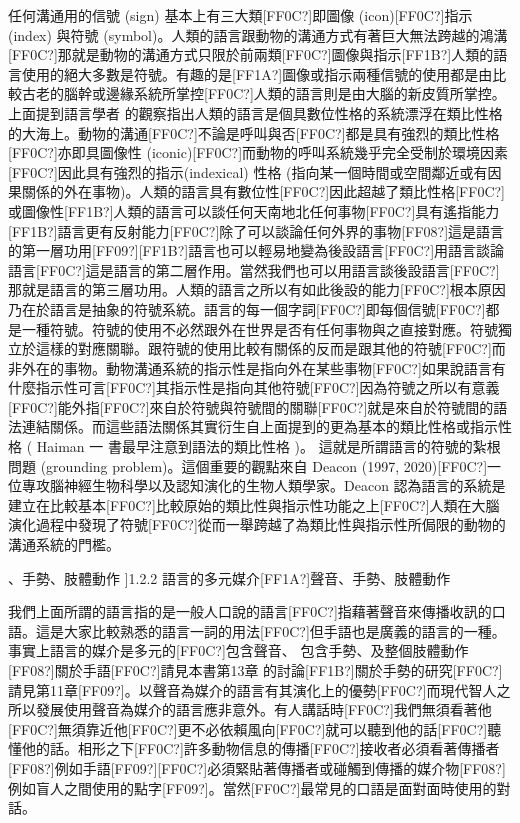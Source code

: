 任何溝通用的信號 (sign) 基本上有三大類[FF0C?]即圖像 (icon)[FF0C?]指示 (index) 與符號 (symbol)。人類的語言跟動物的溝通方式有著巨大無法跨越的鴻溝[FF0C?]那就是動物的溝通方式只限於前兩類[FF0C?]圖像與指示[FF1B?]人類的語言使用的絕大多數是符號。有趣的是[FF1A?]圖像或指示兩種信號的使用都是由比較古老的腦幹或邊緣系統所掌控[FF0C?]人類的語言則是由大腦的新皮質所掌控。上面提到語言學者 \parencite{Bolinger1968} 的觀察指出人類的語言是個具數位性格的系統漂浮在類比性格的大海上。動物的溝通[FF0C?]不論是呼叫與否[FF0C?]都是具有強烈的類比性格[FF0C?]亦即具圖像性 (iconic)[FF0C?]而動物的呼叫系統幾乎完全受制於環境因素[FF0C?]因此具有強烈的指示(indexical) 性格 (指向某一個時間或空間鄰近或有因果關係的外在事物)。人類的語言具有數位性[FF0C?]因此超越了類比性格[FF0C?]或圖像性[FF1B?]人類的語言可以談任何天南地北任何事物[FF0C?]具有遙指能力[FF1B?]語言更有反射能力[FF0C?]除了可以談論任何外界的事物[FF08?]這是語言的第一層功用[FF09?][FF1B?]語言也可以輕易地變為後設語言[FF0C?]用語言談論語言[FF0C?]這是語言的第二層作用。當然我們也可以用語言談後設語言[FF0C?]那就是語言的第三層功用。人類的語言之所以有如此後設的能力[FF0C?]根本原因乃在於語言是抽象的符號系統。語言的每一個字詞[FF0C?]即每個信號[FF0C?]都是一種符號。符號的使用不必然跟外在世界是否有任何事物與之直接對應。符號獨立於這樣的對應關聯。跟符號的使用比較有關係的反而是跟其他的符號[FF0C?]而非外在的事物。動物溝通系統的指示性是指向外在某些事物[FF0C?]如果說語言有什麼指示性可言[FF0C?]其指示性是指向其他符號[FF0C?]因為符號之所以有意義[FF0C?]能外指[FF0C?]來自於符號與符號間的關聯[FF0C?]就是來自於符號間的語法連結關係。而這些語法關係其實衍生自上面提到的更為基本的類比性格或指示性格 ( Haiman 一 書最早注意到語法的類比性格 )。 這就是所謂語言的符號的紮根問題 (grounding problem)。這個重要的觀點來自 Deacon (1997, 2020)[FF0C?]一位專攻腦神經生物科學以及認知演化的生物人類學家。Deacon 認為語言的系統是建立在比較基本[FF0C?]比較原始的類比性與指示性功能之上[FF0C?]人類在大腦演化過程中發現了符號[FF0C?]從而一舉跨越了為類比性與指示性所侷限的動物的溝通系統的門檻。

、手勢、肢體動作  ]{1.2.2 語言的多元媒介[FF1A?]聲音、手勢、肢體動作} 

我們上面所謂的語言指的是一般人口說的語言[FF0C?]指藉著聲音來傳播收訊的口語。這是大家比較熟悉的語言一詞的用法[FF0C?]但手語也是廣義的語言的一種。事實上語言的媒介是多元的[FF0C?]包含聲音、 包含手勢、及整個肢體動作[FF08?]關於手語[FF0C?]請見本書第13章 的討論[FF1B?]關於手勢的研究[FF0C?]請見第11章[FF09?]。以聲音為媒介的語言有其演化上的優勢[FF0C?]而現代智人之所以發展使用聲音為媒介的語言應非意外。有人講話時[FF0C?]我們無須看著他[FF0C?]無須靠近他[FF0C?]更不必依賴風向[FF0C?]就可以聽到他的話[FF0C?]聽懂他的話。相形之下[FF0C?]許多動物信息的傳播[FF0C?]接收者必須看著傳播者[FF08?]例如手語[FF09?][FF0C?]必須緊貼著傳播者或碰觸到傳播的媒介物[FF08?]例如盲人之間使用的點字[FF09?]。當然[FF0C?]最常見的口語是面對面時使用的對話。 

